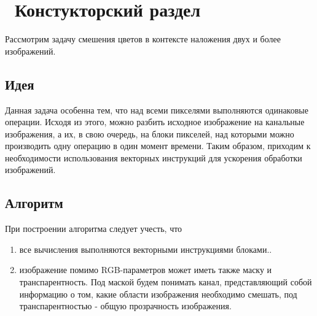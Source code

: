 \chapter{ Констукторский раздел}
\label{cha:design}
 Рассмотрим задачу смешения цветов в контексте наложения двух и более изображений.
 
  \section{Идея}
 Данная задача особенна тем, что над всеми пикселями выполняются одинаковые операции. Исходя из этого, можно разбить исходное изображение на канальные изображения, а их, в свою очередь, на блоки пикселей, над которыми можно производить одну операцию в один момент времени. Таким образом, приходим к необходимости использования векторных инструкций для ускорения обработки изображений.

 \section{Алгоритм }
 При построении алгоритма следует учесть, что 
 \begin{enumerate}
 	\item все вычисления выполняются векторными инструкциями блоками..
 	\item изображение помимо RGB-параметров может иметь также маску и транспарентность. Под маской будем понимать канал, представляющий собой информацию о том, какие области изображения необходимо смешать, под транспарентностью - общую прозрачность изображения.
\end{enumerate}

